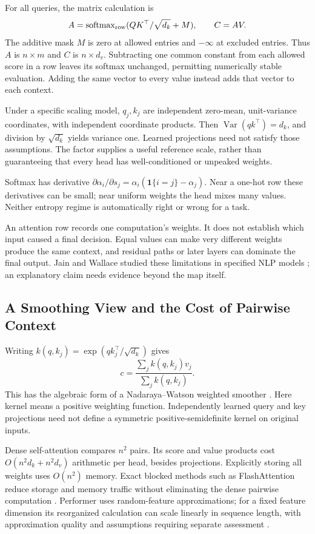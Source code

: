 For all queries, the matrix calculation is
\[
A=\operatorname{softmax}_{\rm row}(QK^\top/\sqrt{d_k}+M),
\qquad C=AV.
\]
The additive mask $M$ is zero at allowed entries and $-\infty$ at excluded entries. Thus $A$ is $n\times m$ and $C$ is $n\times d_v$. Subtracting one common constant from each allowed score in a row leaves its softmax unchanged, permitting numerically stable evaluation. Adding the same vector to every value instead adds that vector to each context.

Under a specific scaling model, $q_j,k_j$ are independent zero-mean, unit-variance coordinates, with independent coordinate products. Then $\operatorname{Var}(qk^\top)=d_k$, and division by $\sqrt{d_k}$ yields variance one. Learned projections need not satisfy those assumptions. The factor supplies a useful reference scale, rather than guaranteeing that every head has well-conditioned or unpeaked weights.

Softmax has derivative $\partial\alpha_i/\partial s_j=\alpha_i(\mathbf1\{i=j\}-\alpha_j)$. Near a one-hot row these derivatives can be small; near uniform weights the head mixes many values. Neither entropy regime is automatically right or wrong for a task.

An attention row records one computation's weights. It does not establish which input caused a final decision. Equal values can make very different weights produce the same context, and residual paths or later layers can dominate the final output. Jain and Wallace studied these limitations in specified NLP models \citep{jain2019attention}; an explanatory claim needs evidence beyond the map itself.

\subsection{A Smoothing View and the Cost of Pairwise Context}

Writing $k(q,k_j)=\exp(qk_j^\top/\sqrt{d_k})$ gives
\[
c=\frac{\sum_j k(q,k_j)v_j}{\sum_j k(q,k_j)}.
\]
This has the algebraic form of a Nadaraya--Watson weighted smoother \citep{tsai2019attentionkernel}. Here kernel means a positive weighting function. Independently learned query and key projections need not define a symmetric positive-semidefinite kernel on original inputs.

Dense self-attention compares $n^2$ pairs. Its score and value products cost $O(n^2d_k+n^2d_v)$ arithmetic per head, besides projections. Explicitly storing all weights uses $O(n^2)$ memory. Exact blocked methods such as FlashAttention reduce storage and memory traffic without eliminating the dense pairwise computation \citep{dao2022flashattention}. Performer uses random-feature approximations; for a fixed feature dimension its reorganized calculation can scale linearly in sequence length, with approximation quality and assumptions requiring separate assessment \citep{choromanski2021performer}.

